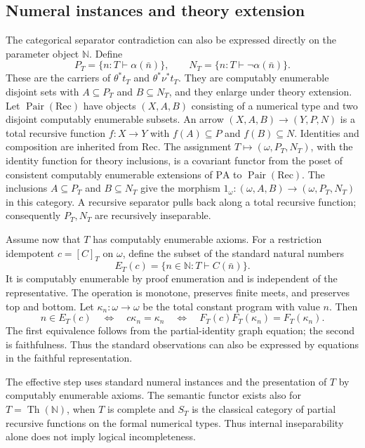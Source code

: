 \documentclass[11pt]{article}
\newcommand{\N}{\mathbb N}
\newcommand{\PA}{\mathrm{PA}}
\begin{document}
\subsection{Numeral instances and theory extension}

The categorical separator contradiction can also be expressed directly
on the parameter object $\N$. Define
\[
 P_T=\{n:T\vdash\alpha(\bar n)\},\qquad
 N_T=\{n:T\vdash\neg\alpha(\bar n)\}.
\]
These are the carriers of $\theta^*t_T$ and $\theta^*\nu^*t_T$.
They are computably enumerable disjoint sets with $A\subseteq P_T$
and $B\subseteq N_T$, and they enlarge under theory extension.
Let $\operatorname{Pair}(\mathrm{Rec})$ have objects $(X,A,B)$ consisting
of a numerical type and two disjoint computably enumerable subsets.
An arrow $(X,A,B)\to(Y,P,N)$ is a total recursive function $f:X\to Y$
with $f(A)\subseteq P$ and $f(B)\subseteq N$. Identities and composition
are inherited from $\mathrm{Rec}$. The assignment
$T\mapsto(\omega,P_T,N_T)$, with the identity function for theory
inclusions, is a covariant functor from the poset of consistent
computably enumerable extensions of $\PA$ to
$\operatorname{Pair}(\mathrm{Rec})$.
The inclusions $A\subseteq P_T$ and $B\subseteq N_T$ give the morphism
$1_\omega:(\omega,A,B)\to(\omega,P_T,N_T)$ in this category.
A recursive separator pulls back along a total recursive function;
consequently $P_T,N_T$ are recursively inseparable.


Assume now that $T$ has computably enumerable axioms. For a restriction idempotent
$c=[C]_T$ on $\omega$, define the subset of the standard natural numbers
\begin{equation}\label{eq:observation}
 E_T(c)=\{n\in\N:T\vdash C(\bar n)\}.
\end{equation}
It is computably enumerable by proof enumeration and is independent of
the representative. The operation is monotone, preserves finite meets,
and preserves top and bottom. Let $\kappa_n:\omega\to\omega$ be the
total constant program with value $n$. Then
\begin{equation}\label{eq:faithful-observation}
 n\in E_T(c)
 \quad\Longleftrightarrow\quad c\kappa_n=\kappa_n
 \quad\Longleftrightarrow\quad
 F_T(c)F_T(\kappa_n)=F_T(\kappa_n).
\end{equation}
The first equivalence follows from the partial-identity graph equation;
the second is faithfulness. Thus the standard observations can also be
expressed by equations in the faithful representation.


The effective step uses standard numeral instances and the presentation
of $T$ by computably enumerable axioms. The semantic functor exists also
for $T=\operatorname{Th}(\N)$, when $T$ is complete and $S_T$ is the
classical category of partial recursive functions on the formal numerical
types. Thus internal inseparability alone does not imply logical
incompleteness.
\end{document}
